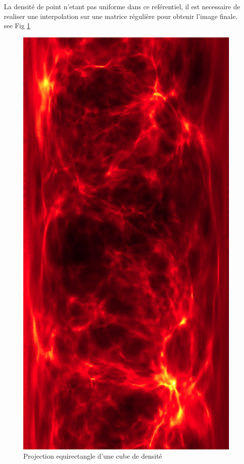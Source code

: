 La densité de point n'etant pas uniforme dans ce reférentiel, il est necessaire de realiser une interpolation sur une matrice régulière pour obtenir l'image finale. see Fig \ref{fig:equirectangle}


\begin{figure}[bth]
        \includegraphics[height=.95\textheight]{img/04/equi.png} 
        \caption{Projection equirectangle d'une cube de densité}
 		\label{fig:equirectangle}
\end{figure}


